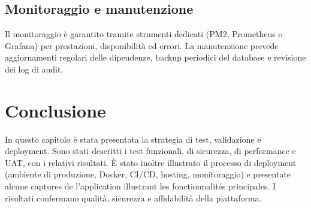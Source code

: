 \subsection{Monitoraggio e manutenzione}
\label{subsec:monitoraggio}

Il monitoraggio è garantito tramite strumenti dedicati (PM2, Prometheus o Grafana) per prestazioni, disponibilità ed errori. La manutenzione prevede aggiornamenti regolari delle dipendenze, backup periodici del database e revisione dei log di audit.

\section{Conclusione}
\label{sec:conclusione-capitolo6}

In questo capitolo è stata presentata la strategia di test, validazione e deployment. Sono stati descritti i test funzionali, di sicurezza, di performance e UAT, con i relativi risultati. È stato inoltre illustrato il processo di deployment (ambiente di produzione, Docker, CI/CD, hosting, monitoraggio) e presentate alcune captures de l'application illustrant les fonctionnalités principales. I risultati confermano qualità, sicurezza e affidabilità della piattaforma.